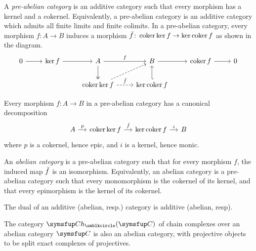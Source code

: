 A \emph{pre-abelian category} is an additive category such that every morphism has a kernel and a cokernel. Equivalently, a pre-abelian category is an additive category which admits all finite limits and finite colimits. In a pre-abelian category, every morphism $f\colon A\to B$ induces a morphism $\bar{f}\colon\operatorname{coker}\operatorname{ker} f\to \operatorname{ker}\operatorname{coker} f$ as shown in the diagram.
\begin{equation*}
  \begin{tikzcd}
    0 & \KER f & A & B & \COKER f & 0\\
    & & \COKER\KER f & \KER\COKER f
    \arrow[from=1-1,]{1-2}[]{}
    \arrow[from=1-2,]{1-3}[]{}
    \arrow[from=1-3,]{1-4}[]{f}
    \arrow[from=1-4,]{1-5}[]{}
    \arrow[from=1-5,]{1-6}[]{}
    \arrow[from=1-3,two heads,]{2-3}[]{}
    \arrow[from=1-4,hookleftarrow,]{2-4}[]{}
    \arrow[from=2-3,dashed,]{1-4}[]{}
    \arrow[from=2-3,dashed,]{2-4}[]{\BAR{f}}
  \end{tikzcd}
\end{equation*}

\begin{proposition}
  Every morphism $f\colon A\to B$ in a pre-abelian category has a canonical decomposition
  \begin{equation*}
    \begin{tikzcd}[sep=small]
      A & \COKER\KER f & \KER\COKER f & B
      \arrow[from=1-1,]{1-2}[]{p}
      \arrow[from=1-2,]{1-3}[]{\BAR{f}}
      \arrow[from=1-3,]{1-4}[]{i}
    \end{tikzcd}
  \end{equation*}
  where $p$ is a cokernel, hence epic, and $i$ is a kernel, hence monic.
\end{proposition}

An \emph{abelian category} is a pre-abelian category such that for every morphism $f$, the induced map $\bar{f}$ is an isomorphism. Equivalently, an abelian category is a pre-abelian category such that every monomorphism is the cokernel of its kernel, and that every epimorphism is the kernel of its cokernel.

\begin{remark}
  The dual of an additive (abelian, resp.) category is additive (abelian, resp).
\end{remark}

\begin{example}
  The category $\CH(\CAT{C})$ of chain complexes over an abelian category $\CAT{C}$ is also an abelian category, with projective objects to be split exact complexes of projectives.
\end{example}

